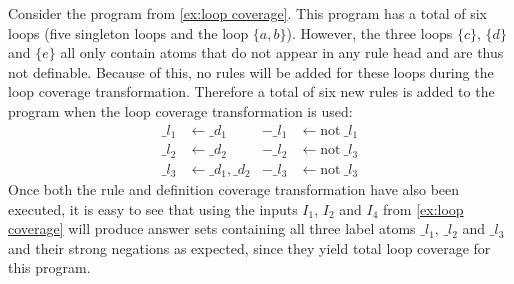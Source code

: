 \begin{example}
\label{ex:loop transformation}
    Consider the program from \cref{ex:loop coverage}. This program has a total of six loops (five singleton loops and the loop $\{a, b\}$). However, the three loops $\{c\}$, $\{d\}$ and $\{e\}$ all only contain atoms that do not appear in any rule head and are thus not definable. Because of this, no rules will be added for these loops during the loop coverage transformation. Therefore a total of six new rules is added to the program when the loop coverage transformation is used:
    \begin{align*}
        \_l_1 &\leftarrow \_d_1  &  -\_l_1 &\leftarrow \text{not}\ \_l_1 \\
        \_l_2 &\leftarrow \_d_2  &  -\_l_2 &\leftarrow \text{not}\ \_l_3 \\
        \_l_3 &\leftarrow \_d_1, \_d_2  &   -\_l_3 &\leftarrow \text{not}\ \_l_3
    \end{align*}
    Once both the rule and definition coverage transformation have also been executed, it is easy to see that using the inputs $I_1$, $I_2$ and $I_4$ from \cref{ex:loop coverage} will produce answer sets containing all three label atoms $\_l_1$, $\_l_2$ and $\_l_3$ and their strong negations as expected, since they yield total loop coverage for this program.
\end{example}

\begin{comment}
- $\_li$ label for every loop i     \/

- first need to find all the loops in the program! -> build positive atom dependency graph, find sccs and then find subsets of sccs that are loops  \/

- for each loop i that consists of atoms $a_m$ to $a_n$ add new rule to program: $\_li :- \_dm, ..., \_dn$.     \/

- if all the atoms $a_m$ to $a_n$ that constitute the loop i are defined (aka definition covered), then all the $\_dm$ to $\_dn$ are true, then loop i is covered and $\_li$ will be in the answer set.     \/

-> $\_li$ in answer set <=> loop i is positively covered

- if any of the atoms $a_m$ to $a_n$ are not defined the loop is negatively covered and  $\_li$ will not be in the answer set       \/

-> $\_li$ not in answer set <=> loop i is negatively covered
\end{comment}

